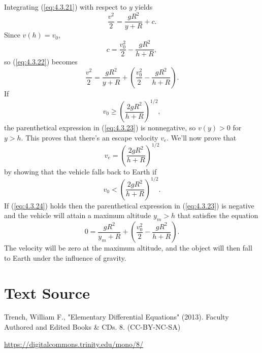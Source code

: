 \documentclass{ximera}
\begin{document}
Integrating (\ref{eq:4.3.21}) with respect to $y$ yields
\begin{equation} \label{eq:4.3.22}
\frac{v^2}{2}=\frac{gR^2}{y+R}+c.
\end{equation}
 Since $v(h)=v_0$,
$$
c=\frac{v_0^2}{2}-\frac{gR^2}{h+R},
$$
 so (\ref{eq:4.3.22}) becomes
\begin{equation} \label{eq:4.3.23}
\frac{v^2}{2}=\frac{gR^2}{y+R}+\left(\frac{v_0^2}{2}-
\frac{gR^2}{h+R}\right).
\end{equation}
If
$$
v_0 \geq\left(\frac{2gR^2}{h+R}\right)^{1/2},
$$
 the parenthetical expression in (\ref{eq:4.3.23})  is nonnegative,
 so $v(y)>0$ for $y>h$. This proves that there's an escape
velocity $v_e$. We'll now prove that
$$
v_e=\left(\frac{2gR^2}{h+R}\right)^{1/2}
$$
by showing that the vehicle falls back to Earth if
\begin{equation} \label{eq:4.3.24}
v_0 <\left(\frac{2gR^2}{h+R}\right)^{1/2}.
\end{equation}
If (\ref{eq:4.3.24})  holds then  the parenthetical expression in
(\ref{eq:4.3.23})
is negative and the vehicle will attain a maximum altitude $y_m>h$
that satisfies the equation
$$
0=\frac{gR^2}{y_m+R}+\left(\frac{v_0^2}{2}-
\frac{gR^2}{h+R}\right).
$$
The velocity will be zero at the maximum  altitude, and the object will
then fall to Earth under the influence of gravity.
 
 
\section*{Text Source}
Trench, William F., "Elementary Differential Equations" (2013). Faculty Authored and Edited Books \& CDs. 8. (CC-BY-NC-SA)
 
\href{https://digitalcommons.trinity.edu/mono/8/}{https://digitalcommons.trinity.edu/mono/8/}
 
 
\end{document}
